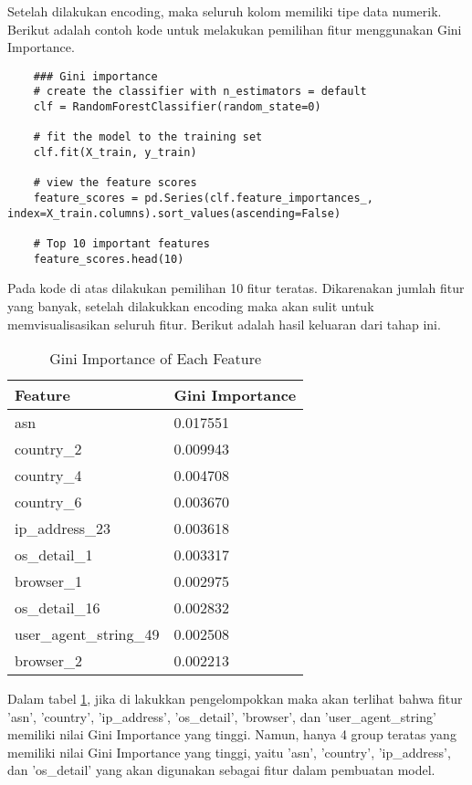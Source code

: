 Setelah dilakukan encoding, maka seluruh kolom memiliki tipe data numerik. Berikut adalah contoh kode untuk melakukan pemilihan fitur menggunakan Gini Importance.

\begin{lstlisting}
    ### Gini importance 
    # create the classifier with n_estimators = default
    clf = RandomForestClassifier(random_state=0)

    # fit the model to the training set
    clf.fit(X_train, y_train)

    # view the feature scores
    feature_scores = pd.Series(clf.feature_importances_, index=X_train.columns).sort_values(ascending=False)
    
    # Top 10 important features
    feature_scores.head(10) 
    \end{lstlisting}

    Pada kode di atas dilakukan pemilihan 10 fitur teratas. Dikarenakan jumlah fitur yang banyak, setelah dilakukkan encoding maka akan sulit untuk memvisualisasikan seluruh fitur.
    Berikut adalah hasil keluaran dari tahap ini.

    \begin{table}[H]
    \caption{Gini Importance of Each Feature}

    \centering
    \begin{tabular}{|l|l|}
    \hline
    \textbf{Feature} & \textbf{Gini Importance} \\ \hline
    asn & 0.017551 \\ 
    country\_2 & 0.009943 \\ 
    country\_4 & 0.004708 \\ 
    country\_6 & 0.003670 \\ 
    ip\_address\_23 & 0.003618 \\ 
    os\_detail\_1 & 0.003317 \\ 
    browser\_1 & 0.002975 \\ 
    os\_detail\_16 & 0.002832 \\ 
    user\_agent\_string\_49 & 0.002508 \\ 
    browser\_2 & 0.002213 \\ \hline
    \end{tabular}
    \label{tab:gini_importance}
    \end{table}

    Dalam tabel \ref{tab:gini_importance}, jika di lakukkan pengelompokkan maka akan terlihat bahwa fitur 'asn', 'country', 'ip\_address', 'os\_detail', 'browser', dan 'user\_agent\_string' memiliki nilai Gini Importance yang tinggi. 
    Namun, hanya 4 group teratas yang memiliki nilai Gini Importance yang tinggi, yaitu 'asn', 'country', 'ip\_address', dan 'os\_detail' yang akan digunakan sebagai fitur dalam pembuatan model.